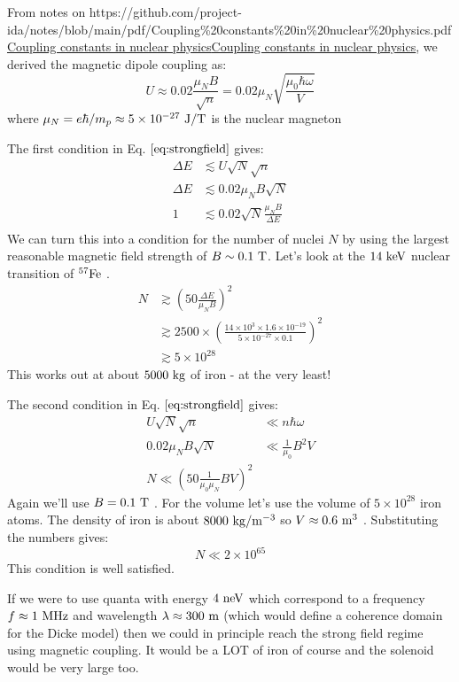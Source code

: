 \documentclass[
]{article}
\let\oldhref\href
\renewcommand{\href}[2]{\ifx#1\urlprefix\oldhref{#1}{#2}\else\uline{\oldhref{#1}{#2}}\fi}
\renewcommand{\[}{\begin{equation}}
\renewcommand{\]}{\end{equation}}
\begin{document}
From notes on
\href{https://github.com/project-ida/notes/blob/main/pdf/Coupling\%20constants\%20in\%20nuclear\%20physics.pdf}{Coupling
constants in nuclear physics}, we derived the magnetic dipole coupling
as: \[
U \approx 0.02 \frac{{\mu_N}B}{\sqrt{n}} = 0.02 {\mu_N}\sqrt{\frac{\mu_0\hbar\omega}{V}}
\] where \(\mu_N = e\hbar/m_p \approx 5\times 10^{-27} \ \rm J/T\) is
the nuclear magneton

The first condition in Eq. \(\ref{eq:strongfield}\) gives: \[
\begin{aligned}
\Delta E &\lesssim U\sqrt{N}\sqrt{n} \\
{\Delta E} &\lesssim  0.02 \mu_N B \sqrt{N} \\
1 &\lesssim 0.02\sqrt{N}\frac{\mu_N B}{\Delta E} \\
\end{aligned}
\] We can turn this into a condition for the number of nuclei \(N\) by
using the largest reasonable magnetic field strength of
\(B\sim 0.1 \ \rm T\). Let's look at the \(\rm 14 \ keV\) nuclear
transition of \(\rm ^{57}Fe\) . \[
\begin{aligned}
N &\gtrsim \left(50\frac{\Delta E}{\mu_N B}\right)^2 \\
&\gtrsim 2500 \times \left(\frac{14 \times 10^3 \times 1.6\times 10^{-19}}{5\times 10^{-27}\times 0.1}\right)^2
\\
&\gtrsim 5 \times 10^{28}
\end{aligned}
\] This works out at about \(5000 \ \rm kg\) of iron - at the very
least!

The second condition in Eq. \(\ref{eq:strongfield}\) gives: \[
\begin{aligned}
U\sqrt{N}\sqrt{n} &\ll  n\hbar \omega \\
0.02 \mu_N B \sqrt{N} &\ll \frac{1}{\mu_0} B^2 V  \\
N \ll \left(50\frac{1}{\mu_0\mu_N}BV\right)^2
\end{aligned}
\] Again we'll use \(B=0.1 \ \rm T\) . For the volume let's use the
volume of \(5 \times 10^{28}\) iron atoms. The density of iron is about
\(8000 \ \rm kg/m^{-3}\) so \(V \approx 0.6 \ \rm m^3\) . Substituting
the numbers gives: \[
N \ll 2\times 10^{65}
\] This condition is well satisfied.

If we were to use quanta with energy \(4 \ \rm neV\) which correspond to
a frequency \(f \approx 1 \ \rm MHz\) and wavelength
\(\lambda \approx 300 \ \rm  m\) (which would define a coherence domain
for the Dicke model) then we could in principle reach the strong field
regime using magnetic coupling. It would be a LOT of iron of course and
the solenoid would be very large too.

\printbibliography
\end{document}

